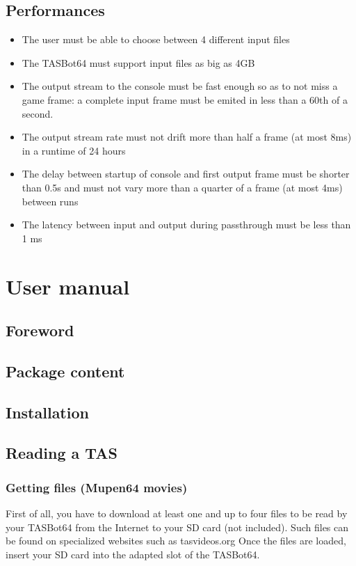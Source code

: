 \documentclass[a4paper,oneside,12pt]{article}
\begin{document}
\subsection{Performances}
\begin{itemize}
\item The user must be able to choose between 4 different input files
\item The TASBot64 must support input files as big as 4GB
\item The output stream to the console must be fast enough so as to not miss a
  game frame: a complete input frame must be emited in less than a 60th of a
  second.
\item The output stream rate must not drift more than half a frame (at most 8ms)
  in a runtime of 24 hours
\item The delay between startup of console and first output frame must be
  shorter than 0.5s and must not vary more than a quarter of a frame (at most
  4ms) between runs
\item The latency between input and output during passthrough must be less than
  1 ms
\end{itemize}

\section{User manual}
\subsection{Foreword}

\subsection{Package content}

\subsection{Installation}

\subsection{Reading a TAS}
\subsubsection{Getting files (Mupen64 movies)}
First of all, you have to download at least one and up to four files to be read 
by your TASBot64 from the Internet to your SD card (not included). Such files 
can be found on specialized websites such as tasvideos.org
Once the files are loaded, insert your SD card into the adapted slot of the 
TASBot64.
\end{document}
